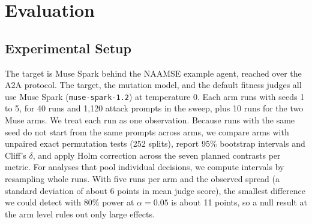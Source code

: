 \documentclass{article}
\begin{document}
\begin{table}[t]
  \caption{Cost of the follow-up analyses and the controlled experiment. The original sweep used seven judge calls per prompt.}
  \label{tab:cost}
  \centering
  \small
\end{table}

\section{Evaluation}
\label{sec:eval}

\subsection{Experimental Setup}

The target is Muse Spark behind the NAAMSE example agent, reached over the A2A protocol.
The target, the mutation model, and the default fitness judges all use Muse Spark (\texttt{muse-spark-1.2}) at temperature 0.
Each arm runs with seeds 1 to 5, for 40 runs and 1{,}120 attack prompts in the sweep, plus 10 runs for the two Muse arms.
We treat each run as one observation.
Because runs with the same seed do not start from the same prompts across arms, we compare arms with unpaired exact permutation tests (252 splits), report 95\% bootstrap intervals and Cliff's $\delta$, and apply Holm correction across the seven planned contrasts per metric.
For analyses that pool individual decisions, we compute intervals by resampling whole runs.
With five runs per arm and the observed spread (a standard deviation of about 6 points in mean judge score), the smallest difference we could detect with 80\% power at $\alpha = 0.05$ is about 11 points, so a null result at the arm level rules out only large effects.
\end{document}
